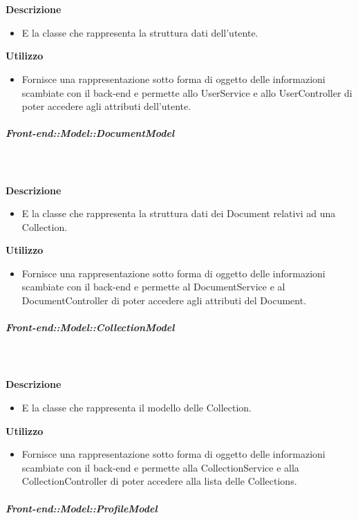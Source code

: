         \textbf{\\ \\ Descrizione} 
          \begin{itemize}
            \item[] E la classe che rappresenta la struttura dati dell'utente.
          \end{itemize}      
        \textbf{Utilizzo}  
          \begin{itemize}
            \item[] Fornisce una rappresentazione sotto forma di oggetto delle informazioni scambiate con il back-end e permette allo UserService e allo UserController di poter accedere agli attributi dell'utente.
          \end{itemize}
      \subparagraph{Front-end::Model::DocumentModel}
        
        \textbf{\\ \\ Descrizione} 
          \begin{itemize}
            \item[] E la classe che rappresenta la struttura dati dei Document relativi ad una Collection.
          \end{itemize}      
        \textbf{Utilizzo}  
          \begin{itemize}
            \item[] Fornisce una rappresentazione sotto forma di oggetto delle informazioni scambiate con il back-end e permette al DocumentService e al DocumentController di poter accedere agli attributi del Document.
          \end{itemize}
      \subparagraph{Front-end::Model::CollectionModel}
        
        \textbf{\\ \\ Descrizione} 
          \begin{itemize}
            \item[] E la classe che rappresenta il modello delle Collection.
          \end{itemize}      
        \textbf{Utilizzo}  
          \begin{itemize}
            \item[] Fornisce una rappresentazione sotto forma di oggetto delle informazioni scambiate con il back-end e permette alla CollectionService e alla CollectionController di poter accedere alla lista delle Collections.
          \end{itemize}
      \subparagraph{Front-end::Model::ProfileModel}
        
